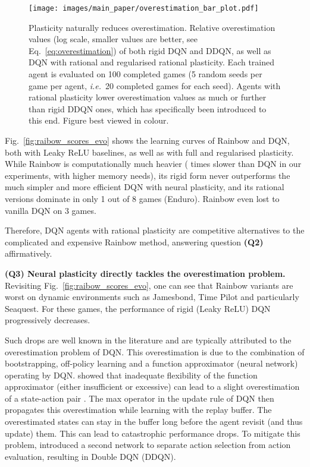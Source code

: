\documentclass[accepted]{article}
\theoremstyle{plain}
\theoremstyle{definition}
\theoremstyle{remark}
\newcommand{\ie}{\emph{i.e.}~}
\begin{document}
\begin{figure*}[t]
    \centering
    \texttt{[image: images/main\_paper/overestimation\_bar\_plot.pdf]}
    \vspace{-0.33 cm}
    \caption{Plasticity naturally reduces overestimation. Relative overestimation values (log scale, smaller values are better, see Eq.~\ref{eq:overestimation}) of both rigid DQN and DDQN, as well as DQN with rational and regularised rational plasticity. Each trained agent is evaluated on 100 completed games (5 random seeds per game per agent, \ie 20 completed games for each seed). Agents with rational plasticity lower overestimation values as much or further than rigid DDQN ones, which has specifically been introduced to this end. Figure best viewed in colour.}
    \label{fig:overestimation_bar_plot}
\end{figure*}
Fig.~\ref{fig:raibow_scores_evo} shows the learning curves of Rainbow and DQN, both with Leaky ReLU baselines, as well as with full and regularised plasticity.
While Rainbow is computationally much heavier ( times slower than DQN in our experiments, with higher memory needs), its rigid form never outperforms the much simpler and more efficient DQN with neural plasticity, and its rational versions dominate in only 1 out of 8 games (Enduro). Rainbow even lost to vanilla DQN on 3 games.

Therefore, DQN agents with rational plasticity are competitive alternatives to the complicated and expensive Rainbow method, answering question \textbf{(Q2)} affirmatively.

{\bf (Q3) Neural plasticity directly tackles the overestimation problem.}
Revisiting Fig.~\ref{fig:raibow_scores_evo}, one can see that Rainbow variants are worst on dynamic environments such as Jamesbond, Time Pilot and particularly Seaquest.
For these games, the performance of rigid (Leaky ReLU) DQN progressively decreases. 

Such drops are well known in the literature and are typically attributed to the overestimation problem of DQN. This overestimation is 
due to the combination of bootstrapping, off-policy learning and a function approximator (neural network) operating by DQN. \citeauthor{van2016deep} showed that inadequate flexibility of the function approximator (either insufficient or excessive) can lead to a slight overestimation of a state-action pair . The max operator in the update rule of DQN then propagates this overestimation while learning with the replay buffer. The overestimated states can stay in the buffer long before the agent revisit (and thus update) them. This can lead to catastrophic performance drops. To mitigate this problem, \citeauthor{van2016deep} introduced a second network to separate action selection from action evaluation, resulting in Double DQN (DDQN). 
\end{document}
